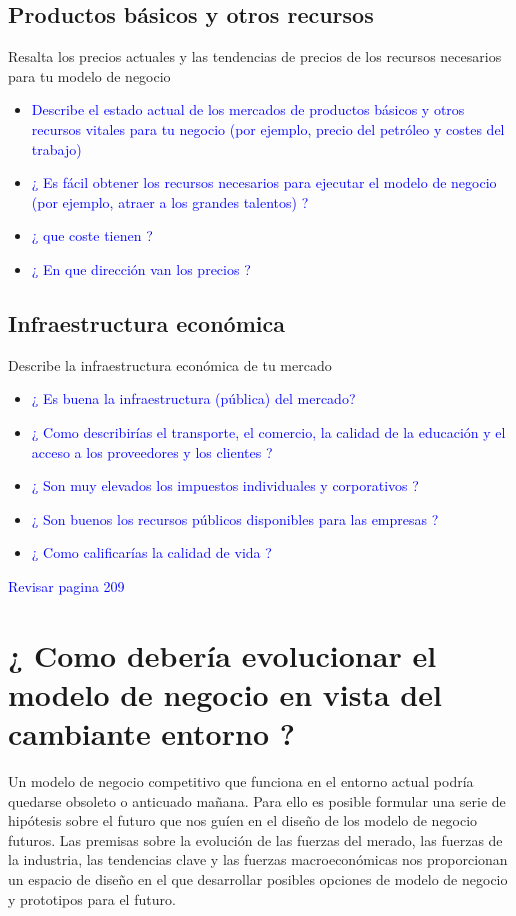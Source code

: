 \documentclass[11pt]{book}
\begin{document}
\subsection{Productos básicos y otros recursos}
Resalta los precios actuales y las tendencias de precios de los recursos necesarios para tu modelo de negocio
\begin{itemize}
\item\textcolor{blue}{ Describe el estado actual de los mercados de productos básicos y otros recursos vitales para tu negocio (por ejemplo, precio del petróleo y costes del trabajo) }
\item\textcolor{blue}{ ¿ Es fácil obtener los recursos necesarios para ejecutar el modelo de negocio (por ejemplo, atraer a los grandes talentos) ? }
\item\textcolor{blue}{ ¿ que coste tienen ? }
\item\textcolor{blue}{ ¿ En que dirección van los precios ? }
\end{itemize}
\subsection{Infraestructura económica}
Describe la infraestructura económica de tu mercado
\begin{itemize}
\item\textcolor{blue}{ ¿ Es buena la infraestructura (pública) del mercado? }
\item\textcolor{blue}{ ¿ Como describirías el transporte, el comercio, la calidad de la educación y el acceso a los proveedores y los clientes ? }
\item\textcolor{blue}{ ¿ Son muy elevados los impuestos individuales y corporativos ? }
\item\textcolor{blue}{ ¿ Son buenos los recursos públicos disponibles para las empresas ? }
\item\textcolor{blue}{ ¿ Como calificarías la calidad de vida ? }
\end{itemize}
\textcolor{blue}{ Revisar pagina 209 }
\section{¿ Como debería evolucionar el modelo de negocio en vista del cambiante entorno ?}
Un modelo de negocio competitivo que funciona en el entorno actual podría quedarse obsoleto o anticuado mañana. Para ello es posible formular una serie de hipótesis sobre el futuro que nos guíen en el diseño de los modelo de negocio futuros.
Las premisas sobre la evolución de las fuerzas del merado, las fuerzas de la industria, las tendencias clave y las fuerzas macroeconómicas nos proporcionan un espacio de diseño en el que desarrollar posibles opciones de modelo de negocio y prototipos para el futuro.
\end{document}
